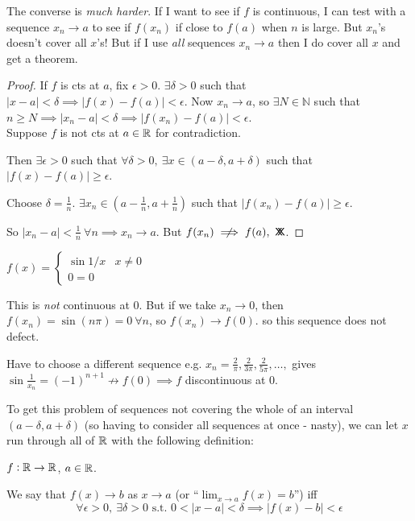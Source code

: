 \documentclass[twoside]{scrartcl}
\newcommand*{\cont}{%
  \mathsf{X}\mkern-8.5mu\mathsf{X}%
}
\begin{document}
The converse is \emph{much harder}. If I want to see if $f$ is continuous, I can test with a sequence $x_n \to a$ to see if $f(x_n)$ if close to $f(a)$ when $n$ is large. But $x_n$'s doesn't cover all $x$'s! But if I use \emph{all} sequences $x_n \to a$ then I do cover all $x$ and get a theorem. 

\begin{proof}
If $f$ is cts at $a$, fix $\epsilon >0$. $\exists \delta > 0$ such that $|x-a| < \delta \implies |f(x) - f(a)| < \epsilon$. Now $x_n \to a$, so $\exists N \in \mathbb{N}$ such that $n \geq N \implies |x_n - a| < \delta \implies |f(x_n) - f(a)| < \epsilon$.\\

\noindent Suppose $f$ is not cts at $a\in \mathbb{R}$ for contradiction.

 Then $\exists \epsilon >0$ such that $\forall \delta >0,~\exists x \in (a-\delta,a+\delta)$ such that $|f(x) -f(a)| \geq \epsilon.$ 
 
 Choose $\delta = \frac{1}{n}$. $\exists x_n \in (a - \frac{1}{n},a + \frac{1}{n})$ such that $|f(x_n) - f(a)| \geq \epsilon$. 
 
 So $|x_n-a| < \frac{1}{n}~\forall n \implies x_n \to a$. But $f(x_n) \centernot\implies f(a),~\cont$.  
\end{proof}\vspace*{5pt}

\begin{example}
$f(x) =\begin{cases}
\sin 1/x & x \neq 0\\
0 = 0
\end{cases}
$	

This is \emph{not} continuous at $0$. But if we take $x_n \to 0$, then $f(x_n) = \sin(n\pi) = 0~\forall n$, so $f(x_n)\to f(0)$. so this sequence does not defect. 

Have to choose a different sequence e.g. $x_n = \frac{2}{\pi},\frac{2}{3\pi},\frac{2}{5\pi},\dots,$ gives $\sin\frac{1}{x_n} = (-1)^{n+1} \not\to f(0) \implies f$ discontinuous at $0$.  
\end{example}

To get this problem of sequences not covering the whole of an interval $(a-\delta, a+\delta)$ (so having to consider all sequences at once - nasty), we can let $x$ run through all of $\mathbb{R}$ with the following definition:\\

\begin{definition}
$f: \mathbb{R}\to \mathbb{R}$, $a\in\mathbb{R}$. 

We say that $f(x) \to b$ as $x \to a$ (or ``$\lim_{x\to a} f(x) = b$'') iff 
\[\forall \epsilon >0,~\exists \delta > 0 \text{ s.t. } 0 < |x-a| < \delta \implies |f(x) - b| < \epsilon\]	
\end{definition}
\end{document}
